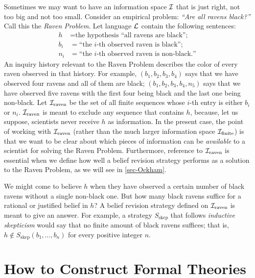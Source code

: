 Sometimes we may want to have an information space $\cal I$ that is just right, not too big and not too small. Consider an empirical problem: {\em ``Are all ravens black?''} Call this the {\em Raven Problem}. Let language ${\cal L}$ contain the following sentences:
$$
  \begin{aligned}
    h   &= \text{the hypothesis ``all ravens are black'';}\\
    b_i &= \text{``the $i$-th observed raven is black'';}\\
    n_i &= \text{``the $i$-th observed raven is non-black.''}
  \end{aligned}
$$
An inquiry history relevant to the Raven Problem describes the color of every raven observed in that history. For example, $(b_{1}, b_{2}, b_{3}, b_{4})$ says that we have observed four ravens and all of them are black; $(b_{1}, b_{2}, b_{3}, b_{4}, n_5)$ says that we have observed five ravens with the first four being black and the last one being non-black. Let ${\cal I}_{\textrm{raven}}$ be the set of all finite sequences whose $i$-th entry is either $b_{i}$ or $n_{i}$. ${\cal I}_{\textrm{raven}}$ is meant to exclude any sequence that contains $h$, because, let us suppose, scientists never receive $h$ as information. In the present case, the point of working with ${\cal I}_{\textrm{raven}}$ (rather than the much larger information space ${\cal I}_{\textrm{finite}}$) is that we want to be clear about which pieces of information can be {\em available} to a scientist for solving the Raven Problem. Furthermore, reference to ${\cal I}_{\textrm{raven}}$ is essential when we define how well a belief revision strategy performs as a solution to the Raven Problem, as we will see in \autoref{sec-Ockham}.

We might come to believe $h$ when they have observed a certain number of black ravens without a single non-black one. But how many black ravens suffice for a rational or justified belief in $h$? A belief revision strategy defined on ${\cal I}_{\textrm{raven}}$ is meant to give an answer. For example, a strategy $S_{\textrm{skep}}$ that follows {\em inductive skepticism} would say that no finite amount of black ravens suffices; that is, $h \not\in S_{\textrm{skep}}(b_1, \ldots, b_n)$ for every positive integer $n$.



\section{How to Construct Formal Theories}\label{sec-how-to-construct}

